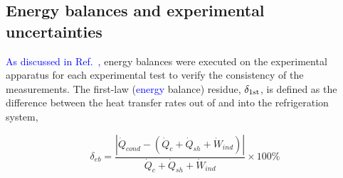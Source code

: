 \documentclass[review,preprint,12pt]{elsarticle}
\begin{document}


\subsection{Energy balances and experimental uncertainties}

\textcolor{blue}{As discussed in Ref.~\cite{OliveiraBarbosaJr.2016},} energy balances were executed on the experimental apparatus for each experimental test to verify the consistency of the measurements. The first-law (\textcolor{blue}{energy} balance) residue, $\delta_{\rm 1st}$, is defined as the difference between the heat transfer rates out of and into the refrigeration system,

\begin{equation}\label{Eq_10}
\delta_{eb} = \frac{|\dot{Q}_{cond} - (\dot{Q}_{c} + \dot{Q}_{sh} + \dot{W}_{ind})|}{\dot{Q}_{c} + \dot{Q}_{sh} + \dot{W}_{ind}} \times 100\%
\end{equation}
\end{document}
